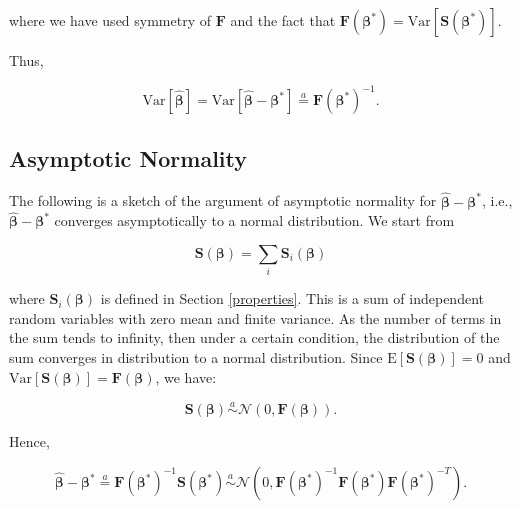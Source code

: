 \documentclass[
  12pt,
]{book}
\begin{document}
where we have used symmetry of \(\boldsymbol{F}\) and the fact that \(\boldsymbol{F}(\boldsymbol{\beta}^*) = {\mathrm{Var}}[\boldsymbol{S}(\boldsymbol{\beta}^*)]\).

Thus,

\begin{equation}
  {\mathrm{Var}}[\hat{\boldsymbol{\beta}}] = {\mathrm{Var}}[\hat{\boldsymbol{\beta}}- \boldsymbol{\beta}^*]
  \stackrel{a}{=} \boldsymbol{F}(\boldsymbol{\beta}^*)^{-1}.
  \label{eq:varhbeta}
\end{equation}

\subsection{Asymptotic Normality}\label{asymptotic-normality}

The following is a sketch of the argument of asymptotic normality for \(\hat{\boldsymbol{\beta}}- \boldsymbol{\beta}^*\), i.e., \(\hat{\boldsymbol{\beta}}- \boldsymbol{\beta}^*\) converges asymptotically to a normal distribution. We start from

\begin{equation}
  \boldsymbol{S}(\boldsymbol{\beta}) = \sum_{i} \boldsymbol{S}_{i}(\boldsymbol{\beta})
\end{equation}

where \(\boldsymbol{S}_{i}(\boldsymbol{\beta})\) is defined in Section \ref{properties}. This is a sum of independent random variables with zero mean and finite variance. As the number of terms in the sum tends to infinity, then under a certain condition, the distribution of the sum converges in distribution to a normal distribution. Since \({\mathrm E}[\boldsymbol{S}(\boldsymbol{\beta})] = 0\) and \({\mathrm{Var}}[\boldsymbol{S}(\boldsymbol{\beta})] = \boldsymbol{F}(\boldsymbol{\beta})\), we have:

\begin{equation}
  \boldsymbol{S}(\boldsymbol{\beta}) \stackrel{a}{\sim} {\mathcal N}(0, \boldsymbol{F}(\boldsymbol{\beta})).
\end{equation}

Hence,

\begin{equation}
  \hat{\boldsymbol{\beta}}- \boldsymbol{\beta}^*
  \stackrel{a}{=} \boldsymbol{F}(\boldsymbol{\beta}^*)^{-1} \boldsymbol{S}(\boldsymbol{\beta}^*)
  \stackrel{a}{\sim} {\mathcal N}(0, \boldsymbol{F}(\boldsymbol{\beta}^*)^{-1} \boldsymbol{F}(\boldsymbol{\beta}^*) \boldsymbol{F}(\boldsymbol{\beta}^*)^{-T}).
\end{equation}
\end{document}
